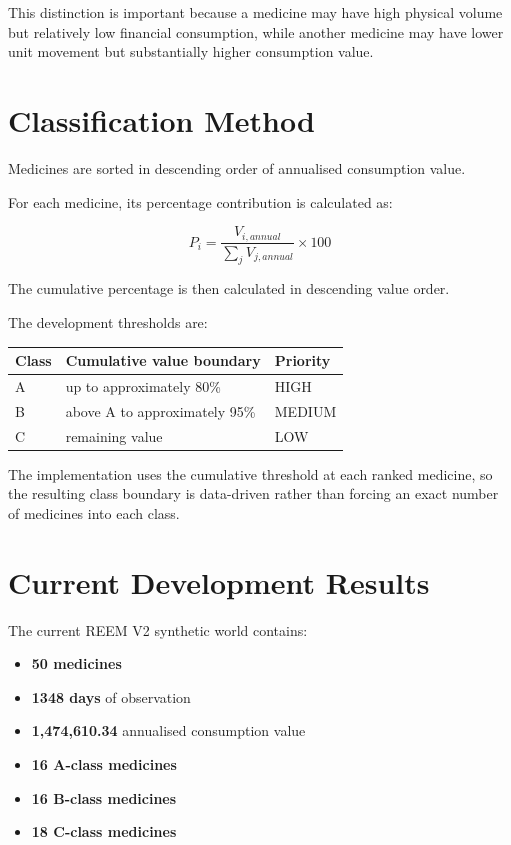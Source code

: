 \documentclass[12pt]{article}
\begin{document}
This distinction is important because a medicine may have high physical
volume but relatively low financial consumption, while another medicine may
have lower unit movement but substantially higher consumption value.

\section{Classification Method}

Medicines are sorted in descending order of annualised consumption value.

For each medicine, its percentage contribution is calculated as:

\begin{equation}
P_i =
\frac{V_{i,annual}}
{\sum_j V_{j,annual}}
\times 100
\end{equation}

The cumulative percentage is then calculated in descending value order.

The development thresholds are:

\begin{center}
\begin{tabular}{lll}
\toprule
Class & Cumulative value boundary & Priority\\
\midrule
A & up to approximately 80\% & HIGH\\
B & above A to approximately 95\% & MEDIUM\\
C & remaining value & LOW\\
\bottomrule
\end{tabular}
\end{center}

The implementation uses the cumulative threshold at each ranked medicine,
so the resulting class boundary is data-driven rather than forcing an exact
number of medicines into each class.

\section{Current Development Results}

The current REEM V2 synthetic world contains:

\begin{itemize}
    \item \textbf{50 medicines}
    \item \textbf{1348 days} of observation
    \item \textbf{1,474,610.34} annualised consumption value
    \item \textbf{16 A-class medicines}
    \item \textbf{16 B-class medicines}
    \item \textbf{18 C-class medicines}
\end{itemize}
\end{document}
